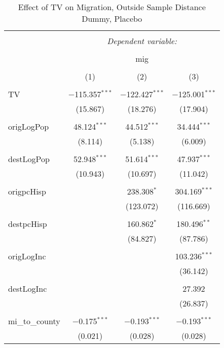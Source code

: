 
\begin{table}[!htbp] \centering 
  \caption{Effect of TV on Migration, Outside Sample Distance Dummy, Placebo} 
  \label{} 
\begin{tabular}{@{\extracolsep{5pt}}lccc} 
\\[-1.8ex]\hline 
\hline \\[-1.8ex] 
 & \multicolumn{3}{c}{\textit{Dependent variable:}} \\ 
\cline{2-4} 
\\[-1.8ex] & \multicolumn{3}{c}{mig} \\ 
\\[-1.8ex] & (1) & (2) & (3)\\ 
\hline \\[-1.8ex] 
 TV & $-$115.357$^{***}$ & $-$122.427$^{***}$ & $-$125.001$^{***}$ \\ 
  & (15.867) & (18.276) & (17.904) \\ 
  & & & \\ 
 origLogPop & 48.124$^{***}$ & 44.512$^{***}$ & 34.444$^{***}$ \\ 
  & (8.114) & (5.138) & (6.009) \\ 
  & & & \\ 
 destLogPop & 52.948$^{***}$ & 51.614$^{***}$ & 47.937$^{***}$ \\ 
  & (10.943) & (10.697) & (11.042) \\ 
  & & & \\ 
 origpcHisp &  & 238.308$^{*}$ & 304.169$^{***}$ \\ 
  &  & (123.072) & (116.669) \\ 
  & & & \\ 
 destpcHisp &  & 160.862$^{*}$ & 180.496$^{**}$ \\ 
  &  & (84.827) & (87.786) \\ 
  & & & \\ 
 origLogInc &  &  & 103.236$^{***}$ \\ 
  &  &  & (36.142) \\ 
  & & & \\ 
 destLogInc &  &  & 27.392 \\ 
  &  &  & (26.837) \\ 
  & & & \\ 
 mi\_to\_county & $-$0.175$^{***}$ & $-$0.193$^{***}$ & $-$0.193$^{***}$ \\ 
  & (0.021) & (0.028) & (0.028) \\ 

\end{tabular}
\end{table}
